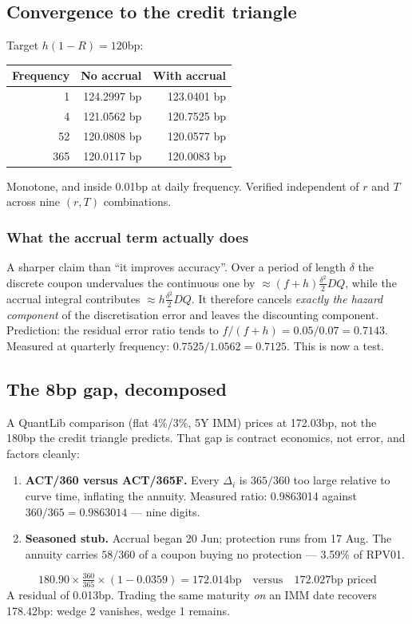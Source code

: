 \documentclass[11pt,a4paper]{article}
\begin{document}
\subsection{Convergence to the credit triangle}

Target $h(1-R) = 120$bp:

\begin{center}
\begin{tabular}{rrr}
\toprule
\textbf{Frequency} & \textbf{No accrual} & \textbf{With accrual} \\
\midrule
1   & 124.2997 bp & 123.0401 bp \\
4   & 121.0562 bp & 120.7525 bp \\
52  & 120.0808 bp & 120.0577 bp \\
365 & 120.0117 bp & 120.0083 bp \\
\bottomrule
\end{tabular}
\end{center}

Monotone, and inside 0.01bp at daily frequency. Verified independent of $r$ and $T$ across
nine $(r,T)$ combinations.

\subsubsection*{What the accrual term actually does}

A sharper claim than ``it improves accuracy''. Over a period of length $\delta$ the discrete
coupon undervalues the continuous one by $\approx (f+h)\frac{\delta^2}{2}DQ$, while the
accrual integral contributes $\approx h\frac{\delta^2}{2}DQ$. It therefore cancels
\emph{exactly the hazard component} of the discretisation error and leaves the discounting
component. Prediction: the residual error ratio tends to $f/(f+h) = 0.05/0.07 = 0.7143$.
Measured at quarterly frequency: $0.7525/1.0562 = 0.7125$. This is now a test.

\subsection{The 8bp gap, decomposed}

A QuantLib comparison (flat 4\%/3\%, 5Y IMM) prices at 172.03bp, not the 180bp the credit
triangle predicts. That gap is contract economics, not error, and factors cleanly:

\begin{enumerate}[leftmargin=1.4em]
\item \textbf{ACT/360 versus ACT/365F.} Every $\Delta_i$ is $365/360$ too large relative to
curve time, inflating the annuity. Measured ratio: 0.9863014 against
$360/365 = 0.9863014$ --- nine digits.
\item \textbf{Seasoned stub.} Accrual began 20 Jun; protection runs from 17 Aug. The annuity
carries $58/360$ of a coupon buying no protection --- 3.59\% of RPV01.
\end{enumerate}
\[
180.90 \times \tfrac{360}{365} \times (1 - 0.0359) = 172.014\text{bp}
\quad\text{versus}\quad 172.027\text{bp priced}
\]
A residual of 0.013bp. Trading the same maturity \emph{on} an IMM date recovers 178.42bp:
wedge 2 vanishes, wedge 1 remains.
\end{document}

